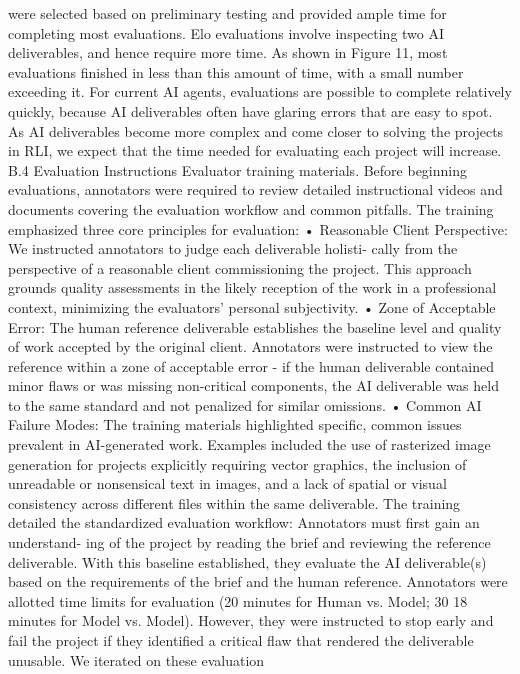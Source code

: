 were selected based on preliminary testing and provided ample time for completing most evaluations.
Elo evaluations involve inspecting two AI deliverables, and hence require more time. As shown in
Figure 11, most evaluations finished in less than this amount of time, with a small number exceeding
it.
For current AI agents, evaluations are possible to complete relatively quickly, because AI deliverables
often have glaring errors that are easy to spot. As AI deliverables become more complex and come
closer to solving the projects in RLI, we expect that the time needed for evaluating each project will
increase.
B.4
Evaluation Instructions
Evaluator training materials.
Before beginning evaluations, annotators were required to review
detailed instructional videos and documents covering the evaluation workflow and common pitfalls.
The training emphasized three core principles for evaluation:
• Reasonable Client Perspective: We instructed annotators to judge each deliverable holisti-
cally from the perspective of a reasonable client commissioning the project. This approach
grounds quality assessments in the likely reception of the work in a professional context,
minimizing the evaluators’ personal subjectivity.
• Zone of Acceptable Error: The human reference deliverable establishes the baseline level
and quality of work accepted by the original client. Annotators were instructed to view the
reference within a zone of acceptable error - if the human deliverable contained minor flaws
or was missing non-critical components, the AI deliverable was held to the same standard
and not penalized for similar omissions.
• Common AI Failure Modes: The training materials highlighted specific, common issues
prevalent in AI-generated work. Examples included the use of rasterized image generation
for projects explicitly requiring vector graphics, the inclusion of unreadable or nonsensical
text in images, and a lack of spatial or visual consistency across different files within the
same deliverable.
The training detailed the standardized evaluation workflow: Annotators must first gain an understand-
ing of the project by reading the brief and reviewing the reference deliverable. With this baseline
established, they evaluate the AI deliverable(s) based on the requirements of the brief and the human
reference. Annotators were allotted time limits for evaluation (20 minutes for Human vs. Model; 30
18
minutes for Model vs. Model). However, they were instructed to stop early and fail the project if
they identified a critical flaw that rendered the deliverable unusable. We iterated on these evaluation
